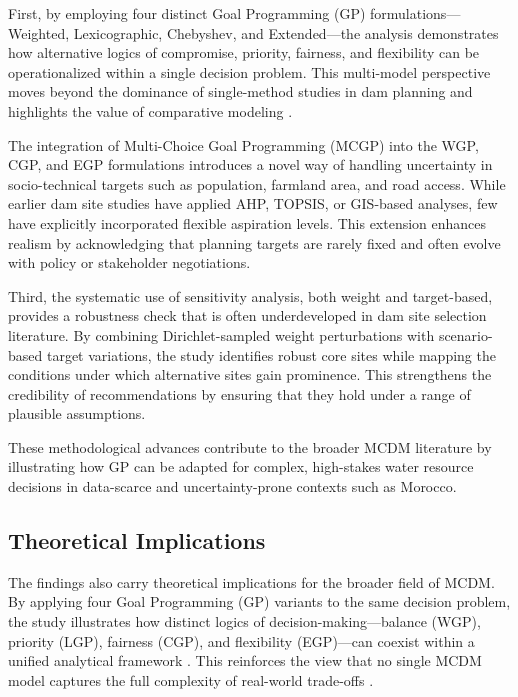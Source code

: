 First, by employing four distinct Goal Programming (GP) formulations—Weighted, Lexicographic, Chebyshev, and Extended—the analysis demonstrates how alternative logics of compromise, priority, fairness, and flexibility can be operationalized within a single decision problem. This multi-model perspective moves beyond the dominance of single-method studies in dam planning and highlights the value of comparative modeling \cite{Belton2002,Aruldoss2013}.  

The integration of Multi-Choice Goal Programming (MCGP) into the WGP, CGP, and EGP formulations introduces a novel way of handling uncertainty in socio-technical targets such as population, farmland area, and road access. While earlier dam site studies have applied AHP, TOPSIS, or GIS-based analyses, few have explicitly incorporated flexible aspiration levels. This extension enhances realism by acknowledging that planning targets are rarely fixed and often evolve with policy or stakeholder negotiations.  

Third, the systematic use of sensitivity analysis, both weight and target-based, provides a robustness check that is often underdeveloped in dam site selection literature. By combining Dirichlet-sampled weight perturbations with scenario-based target variations, the study identifies robust core sites while mapping the conditions under which alternative sites gain prominence. This strengthens the credibility of recommendations by ensuring that they hold under a range of plausible assumptions.  

These methodological advances contribute to the broader MCDM literature by illustrating how GP can be adapted for complex, high-stakes water resource decisions in data-scarce and uncertainty-prone contexts such as Morocco.

\subsection{Theoretical Implications}
The findings also carry theoretical implications for the broader field of MCDM.  
By applying four Goal Programming (GP) variants to the same decision problem, the study illustrates how distinct logics of decision-making—balance (WGP), priority (LGP), fairness (CGP), and flexibility (EGP)—can coexist within a unified analytical framework \cite{JonesTamiz2010_PracticalGP}. This reinforces the view that no single MCDM model captures the full complexity of real-world trade-offs \cite{KUMAR2017596,Aruldoss2013}.  

